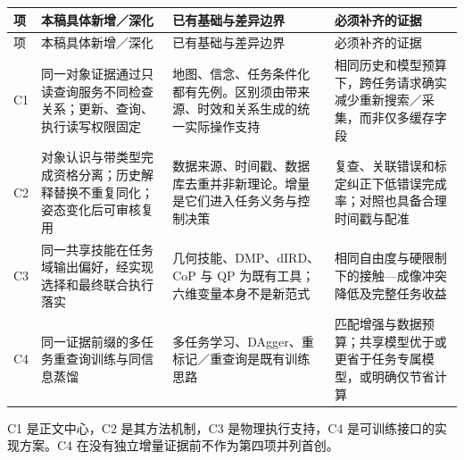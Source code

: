 \documentclass[UTF8,11pt,a4paper,fontset=fandol]{ctexart}
\numberwithin{equation}{section}
\theoremstyle{definition}
\begin{document}
\begin{longtable}{P{11mm}P{36mm}P{50mm}P{49mm}}
\toprule
项 & 本稿具体新增／深化 & 已有基础与差异边界 & 必须补齐的证据\\\midrule\endfirsthead
\toprule 项 & 本稿具体新增／深化 & 已有基础与差异边界 & 必须补齐的证据\\\midrule\endhead
C1 & 同一对象证据通过只读查询服务不同检查关系；更新、查询、执行读写权限固定 & 地图、信念、任务条件化都有先例。区别须由带来源、时效和关系生成的统一实际操作支持 & 相同历史和模型预算下，跨任务请求确实减少重新搜索／采集，而非仅多缓存字段\\
C2 & 对象认识与带类型完成资格分离；历史解释替换不重复同化；姿态变化后可审核复用 & 数据来源、时间戳、数据库去重并非新理论。增量是它们进入任务义务与控制决策 & 复查、关联错误和标定纠正下低错误完成率；对照也具备合理时间戳与配准\\
C3 & 同一共享技能在任务域输出偏好，经实现选择和最终联合执行落实 & 几何技能、DMP、dIRD、CoP 与 QP 为既有工具；六维变量本身不是新范式 & 相同自由度与硬限制下的接触—成像冲突降低及完整任务收益\\
C4 & 同一证据前缀的多任务重查询训练与同信息蒸馏 & 多任务学习、DAgger、重标记／重查询是既有训练思路 & 匹配增强与数据预算；共享模型优于或更省于任务专属模型，或明确仅节省计算\\\bottomrule
\end{longtable}
C1 是正文中心，C2 是其方法机制，C3 是物理执行支持，C4 是可训练接口的实现方案。C4 在没有独立增量证据前不作为第四项并列首创。
\end{document}
